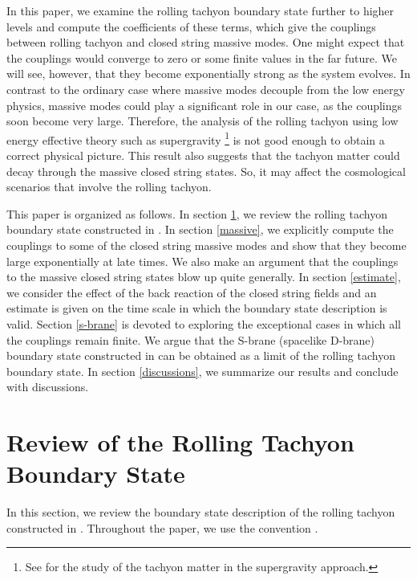 \documentclass[a4paper,12pt]{article} \textheight=8.5truein
\begin{document}
In this paper, we examine the rolling tachyon boundary state
further to higher levels and compute the coefficients of these
terms, which give the couplings between rolling tachyon and closed
string massive modes. One might expect that the couplings would
converge to zero or some finite values in the far future. We will
see, however, that they become exponentially strong as the system
evolves. In contrast to the ordinary case where massive modes
decouple from the low energy physics, massive modes could play a
significant role in our case, as the couplings soon become very
large. Therefore, the analysis of the rolling tachyon using low
energy effective theory such as supergravity \footnote{See
\cite{Ohta:2002ac,Buchel:2002tj} for the study of the tachyon
matter in the supergravity approach.} is not good enough to obtain
a correct physical picture. This result also suggests that the
tachyon matter could decay through the massive closed string
states. So, it may affect the cosmological scenarios that involve
the rolling tachyon.


This paper is organized as follows.
In section \ref{review}, we review the rolling tachyon
 boundary state constructed in \cite{Sen:2002nu,Sen:2002in}.
In section \ref{massive}, we explicitly compute the couplings to
some of the closed string massive modes and show that they become
large exponentially at late times. We also make an argument that
the couplings to the massive closed string states blow up quite
generally. In section \ref{estimate}, we consider the effect of
the back reaction of the closed string fields and an estimate is
given on the time scale in which the boundary state description is
valid. Section \ref{s-brane} is devoted to exploring the
exceptional cases in which all the couplings remain finite. We
argue that the S-brane (spacelike D-brane) boundary state
constructed in \cite{Gutperle:2002ai} can be obtained as a limit
of the rolling tachyon boundary state. In section
\ref{discussions}, we summarize our results and conclude with
discussions.

\section{Review of the Rolling Tachyon Boundary State} \label{review}

In this section, we review the boundary state description of the
rolling tachyon constructed in \cite{Sen:2002nu,Sen:2002in}.
Throughout the paper, we use the convention \coordHE{}.
\end{document}
